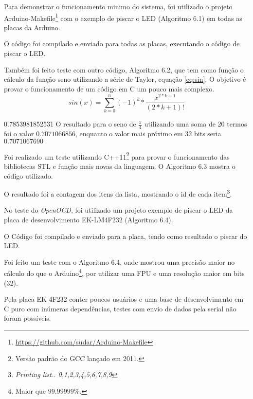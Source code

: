 Para demonstrar o funcionamento minimo do sistema, foi utilizado o projeto Arduino-Makefile\footnote{\url{https://github.com/sudar/Arduino-Makefile}} com o exemplo de piscar o LED (Algoritmo 6.1) em todas as placas da Arduino.



O código foi compilado e enviado para todas as placas, executando o código de piscar o LED.

Também foi feito teste com outro código, Algoritmo 6.2, que tem como função o cálculo da função seno utilizando a série de Taylor, equação \ref{eq:sin}. O objetivo é provar o funcionamento de um código em C um pouco mais complexo.
\begin{equation}
sin(x) = \sum_{k=0}^{n} (-1)^k * \frac{x^{2*k+1}}{(2*k+1)!}
\label{eq:sin} 
\end{equation}

0.7853981852531
O resultado para o seno de $\frac{\pi}{4}$ utilizando uma soma de 20 termos foi o valor $0.7071066856$, enquanto o valor mais próximo em 32 bits seria $0.7071067690$

Foi realizado um teste utilizando C++11\footnote{Versão padrão do GCC lançado em 2011.} para provar o funcionamento das bibliotecas STL e função mais novas da linguagem. O Algoritmo 6.3 mostra o código utilizado.



O resultado foi a contagem dos itens da lista, mostrando o id de cada item\footnote{\textit{Printing list.. 0,1,2,3,4,5,6,7,8,9}}.

No teste do \textit{OpenOCD}, foi utilizado um projeto exemplo de piscar o LED da placa de desenvolvimento EK-LM4F232 (Algoritmo 6.4).



O Código foi compilado e enviado para a placa, tendo como resultado o piscar do LED.

Foi feito um teste com o Algoritmo 6.4, onde mostrou uma precisão maior no cálculo do que o Arduino\footnote{Maior que $99.99999\%$.}, por utilizar uma FPU e uma resolução maior em bits (32).



Pela placa EK-4F232 conter poucos usuários e uma base de desenvolvimento em C puro com inúmeras dependências, testes com envio de dados pela serial não foram possíveis.

